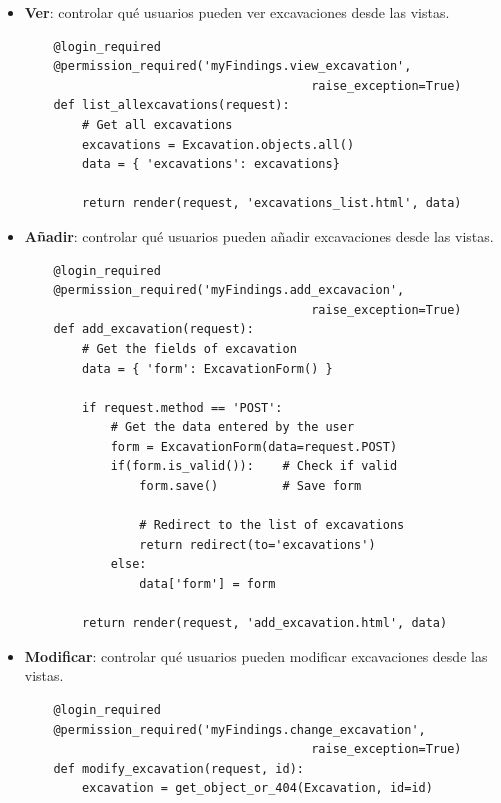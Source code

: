     \begin{itemize}
        \item \textbf{Ver}: controlar qué usuarios pueden ver excavaciones desde las
        vistas.
    
    \begin{verbatim}
    @login_required
    @permission_required('myFindings.view_excavation', 
                                        raise_exception=True)
    def list_allexcavations(request):
        # Get all excavations
        excavations = Excavation.objects.all()
        data = { 'excavations': excavations}
    
        return render(request, 'excavations_list.html', data)
    \end{verbatim}

        \item \textbf{Añadir}: controlar qué usuarios pueden añadir excavaciones
        desde las vistas.
    
    \begin{verbatim}
    @login_required
    @permission_required('myFindings.add_excavacion', 
                                        raise_exception=True)
    def add_excavation(request):
        # Get the fields of excavation
        data = { 'form': ExcavationForm() }
    
        if request.method == 'POST':
            # Get the data entered by the user
            form = ExcavationForm(data=request.POST)
            if(form.is_valid()):    # Check if valid
                form.save()         # Save form
    
                # Redirect to the list of excavations
                return redirect(to='excavations')
            else:
                data['form'] = form
    
        return render(request, 'add_excavation.html', data)
    \end{verbatim}

        \item \textbf{Modificar}: controlar qué usuarios pueden modificar excavaciones
        desde las vistas.
    
    \begin{verbatim}
    @login_required
    @permission_required('myFindings.change_excavation', 
                                        raise_exception=True)
    def modify_excavation(request, id):
        excavation = get_object_or_404(Excavation, id=id)
        

\end{verbatim}
\end{itemize}

